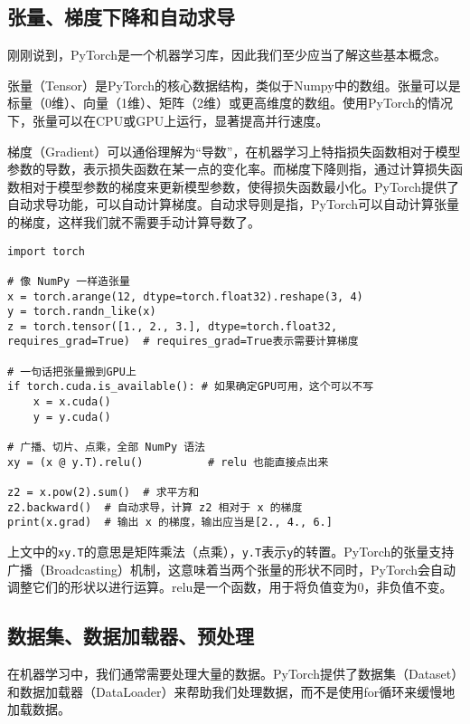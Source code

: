 \documentclass[../main.tex]{subfiles}
\begin{document}
\subsection{张量、梯度下降和自动求导}

刚刚说到，PyTorch是一个机器学习库，因此我们至少应当了解这些基本概念。

张量（Tensor）是PyTorch的核心数据结构，类似于Numpy中的数组。张量可以是标量（0维）、向量（1维）、矩阵（2维）或更高维度的数组。使用PyTorch的情况下，张量可以在CPU或GPU上运行，显著提高并行速度。

梯度（Gradient）可以通俗理解为“导数”，在机器学习上特指损失函数相对于模型参数的导数，表示损失函数在某一点的变化率。而梯度下降则指，通过计算损失函数相对于模型参数的梯度来更新模型参数，使得损失函数最小化。PyTorch提供了自动求导功能，可以自动计算梯度。自动求导则是指，PyTorch可以自动计算张量的梯度，这样我们就不需要手动计算导数了。

\begin{lstlisting}
import torch

# 像 NumPy 一样造张量
x = torch.arange(12, dtype=torch.float32).reshape(3, 4)
y = torch.randn_like(x)
z = torch.tensor([1., 2., 3.], dtype=torch.float32, requires_grad=True)  # requires_grad=True表示需要计算梯度

# 一句话把张量搬到GPU上
if torch.cuda.is_available(): # 如果确定GPU可用，这个可以不写
    x = x.cuda()
    y = y.cuda()

# 广播、切片、点乘，全部 NumPy 语法
xy = (x @ y.T).relu()          # relu 也能直接点出来

z2 = x.pow(2).sum()  # 求平方和
z2.backward()  # 自动求导，计算 z2 相对于 x 的梯度
print(x.grad)  # 输出 x 的梯度，输出应当是[2., 4., 6.]

\end{lstlisting}

上文中的\texttt{x\@ y.T}的意思是矩阵乘法（点乘），\texttt{y.T}表示\texttt{y}的转置。PyTorch的张量支持广播（Broadcasting）机制，这意味着当两个张量的形状不同时，PyTorch会自动调整它们的形状以进行运算。relu是一个函数，用于将负值变为0，非负值不变。

\subsection{数据集、数据加载器、预处理}

在机器学习中，我们通常需要处理大量的数据。PyTorch提供了数据集（Dataset）和数据加载器（DataLoader）来帮助我们处理数据，而不是使用for循环来缓慢地加载数据。
\end{document}
